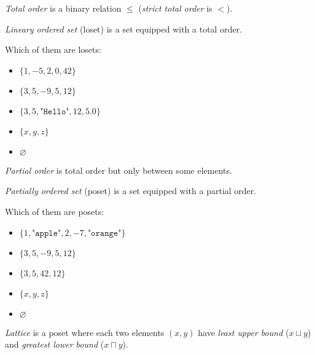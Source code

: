 \documentclass{article}
\begin{document}
\emph{Total order} is a binary relation \(\leq\) (\emph{strict total order} is \(<\)).

\emph{Lineary ordered set} (loset) is a set equipped with a total order.

Which of them are losets:

\begin{itemize}[label={}]
\item \(\{ 1, -5, 2, 0, 42 \}\)
\item \(\{ 3, 5, -9, 5, 12 \}\)
\item \(\{ 3, 5, \texttt{"Hello"}, 12, 5.0 \}\)
\item \(\{ x, y, z \}\)
\item \(\varnothing\)
\end{itemize}

\plush{}


\emph{Partial order} is total order but only between some elements.

\emph{Partially ordered set} (poset) is a set equipped with a partial order.

Which of them are posets:

\begin{itemize}[label={}]
\item \(\{ 1, \texttt{"apple"}, 2, -7, \texttt{"orange"} \}\)
\item \(\{ 3, 5, -9, 5, 12 \}\)
\item \(\{ 3, 5, 42, 12 \}\)
\item \(\{ x, y, z \}\)
\item \(\varnothing\)
\end{itemize}

\plush{}


\emph{Lattice} is a poset where each two elements \((x, y)\) have \emph{least upper bound} (\(x \sqcup y\)) and
\emph{greatest lower bound} (\(x \sqcap y\)).
\end{document}
